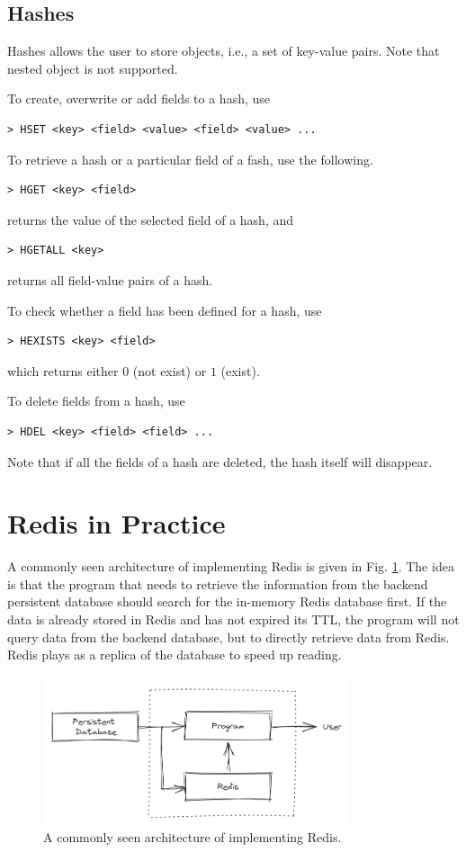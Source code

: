 \subsection{Hashes}

Hashes allows the user to store objects, i.e., a set of key-value pairs. Note that nested object is not supported.

To create, overwrite or add fields to a hash, use
\begin{lstlisting}
> HSET <key> <field> <value> <field> <value> ...
\end{lstlisting} 

To retrieve a hash or a particular field of a fash, use the following.
\begin{lstlisting}
> HGET <key> <field>
\end{lstlisting}
returns the value of the selected field of a hash, and
\begin{lstlisting}
> HGETALL <key>
\end{lstlisting}
returns all field-value pairs of a hash.

To check whether a field has been defined for a hash, use
\begin{lstlisting}
> HEXISTS <key> <field>
\end{lstlisting}
which returns either $0$ (not exist) or $1$ (exist).

To delete fields from a hash, use
\begin{lstlisting}
> HDEL <key> <field> <field> ...
\end{lstlisting}
Note that if all the fields of a hash are deleted, the hash itself will disappear.

\section{Redis in Practice}

A commonly seen architecture of implementing Redis is given in Fig. \ref{ch:database:redisarchitecture}. The idea is that the program that needs to retrieve the information from the backend persistent database should search for the in-memory Redis database first. If the data is already stored in Redis and has not expired its TTL, the program will not query data from the backend database, but to directly retrieve data from Redis. Redis plays as a replica of the database to speed up reading.

\begin{figure}[htbp]
	\centering
	\includegraphics[width=0.8\textwidth]{chapters/part-3/figures/redis_architecture.png}
	\caption{A commonly seen architecture of implementing Redis.} \label{ch:database:redisarchitecture}
\end{figure}

